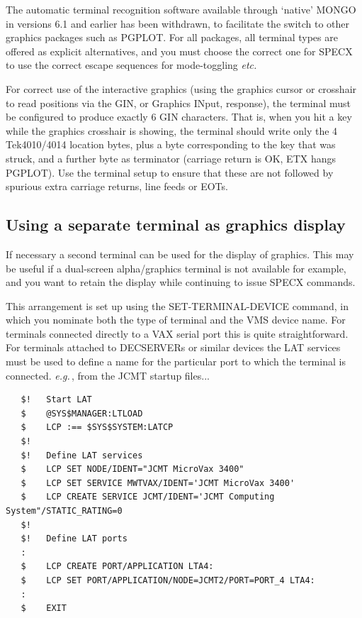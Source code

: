 \documentclass[11pt,twoside]{report}
\newcommand{\eg}{{\it e.g.\,}}
\begin{document}
The automatic terminal recognition software available through `native' MONGO
in versions 6.1 and earlier has been withdrawn, to facilitate the switch to
other graphics packages such as PGPLOT. For all packages, all terminal types
are offered as explicit alternatives, and you must choose the correct one
for SPECX to use the correct escape sequences for mode-toggling {\it etc.}

For correct use of the interactive graphics (using the graphics cursor or
crosshair to read positions via the GIN, or Graphics INput, response), the terminal
must be configured to produce exactly 6 GIN characters. That is, when you hit a
key while the graphics crosshair is showing, the terminal should write only
the 4 Tek4010/4014 location bytes, plus a byte corresponding to the key that
was struck, and a further byte as terminator (carriage return is OK, ETX hangs
PGPLOT). Use the terminal setup to ensure that these are not followed by
spurious extra carriage returns, line feeds or EOTs.

\subsection{Using a separate terminal as graphics display}

\label{graphics}
If necessary a second terminal can be used for the display of graphics.
This may be useful if a dual-screen alpha/graphics terminal is not available
for example, and you want to retain the display while continuing to issue
SPECX commands.

This arrangement is set up using the SET-TERMINAL-DEVICE command, in which
you nominate both the type of terminal and the VMS device name. For terminals
connected directly to a VAX serial port this is quite straightforward. For
terminals attached to DECSERVERs or similar devices the LAT services must
be used to define a name for the particular port to which the terminal is
connected. \eg, from the JCMT startup files...

\begin{verbatim}
   $!   Start LAT
   $    @SYS$MANAGER:LTLOAD
   $    LCP :== $SYS$SYSTEM:LATCP
   $!
   $!   Define LAT services
   $    LCP SET NODE/IDENT="JCMT MicroVax 3400"
   $    LCP SET SERVICE MWTVAX/IDENT='JCMT MicroVax 3400'
   $    LCP CREATE SERVICE JCMT/IDENT='JCMT Computing System"/STATIC_RATING=0
   $!
   $!   Define LAT ports
   :
   $    LCP CREATE PORT/APPLICATION LTA4:
   $    LCP SET PORT/APPLICATION/NODE=JCMT2/PORT=PORT_4 LTA4:
   :
   $    EXIT
\end{verbatim}
\end{document}
